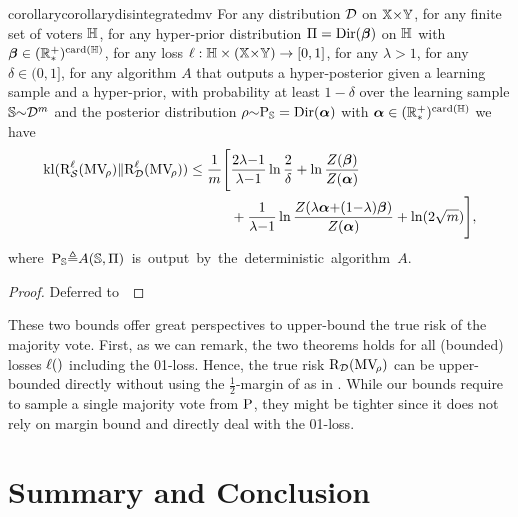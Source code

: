 \begin{restatable}{corollary}{corollarydisintegratedmv}\label{chap:dis-pra:corollary:disintegrated-mv}
For any distribution $\mathcal{D}$ on $\mathbb{X}{\times}\mathbb{Y}$, for any finite set of voters $\mathbb{H}$, for any hyper-prior distribution $\Pi=\textrm{Dir}(\boldsymbol{\beta})$ on $\mathbb{H}$ with $\boldsymbol{\beta}\in(\mathbb{R}^{+}_{*})^{\operatorname{card}(\mathbb{H})}$, for any loss $\ell: \mathbb{H}\times(\mathbb{X}{\times}\mathbb{Y})\to [0,1]$, for any $\lambda>1$, for any $\delta \in (0, 1]$, for any algorithm \mbox{$A$} that outputs a hyper-posterior given a learning sample and a hyper-prior, with probability at least $1{-}\delta$ over the learning sample $\mathbb{S}{\sim}\mathcal{D}^{m}$ and the posterior distribution $\rho{\sim} \mathrm{P}_{\mathbb{S}}=\textrm{Dir}(\boldsymbol{\alpha})$ with $\boldsymbol{\alpha}\in(\mathbb{R}^{+}_{*})^{\operatorname{card}(\mathbb{H})}$ we have
\begin{align*}
    \operatorname{kl}(\text{R}^{\ell}_{\mathcal{S}}(\text{MV}_{\!\rho})\|\text{R}^{\ell}_{\mathcal{D}}(\text{MV}_{\!\rho})) \le \frac{1}{m}\Bigg[&{\frac{2\lambda{-}1}{\lambda{-}1}}\ln\frac{2}{\delta}+ \ln\frac{Z(\boldsymbol{\beta})}{Z(\boldsymbol{\alpha})}\\
    &+ \frac{1}{\lambda{-}1}\ln\frac{Z(\lambda\boldsymbol{\alpha}{+}(1{-}\lambda)\boldsymbol{\beta})}{Z(\boldsymbol{\alpha})} + \ln(2\sqrt{m})\Bigg],
\end{align*}
\mbox{where $\mathrm{P}_{\mathbb{S}}{\triangleq}A(\mathbb{S},\Pi)$ is output by the deterministic algorithm $A$}.
\end{restatable}
\begin{noaddcontents}\begin{proof}
Deferred to~
\end{proof}\end{noaddcontents}

These two bounds offer great perspectives to upper-bound the true risk of the majority vote.
First, as we can remark, the two theorems holds for all (bounded) losses $\ell()$ including the 01-loss.
Hence, the true risk $\text{R}_{\mathcal{D}}(\text{MV}_{\!\rho})$ can be upper-bounded directly without using the $\frac{1}{2}$-margin of \citet{LavioletteMorvantRalaivolaRoy2017} as in .
While our bounds require to sample a single majority vote from $\mathrm{P}$, they might be tighter since it does not rely on margin bound \citep[as][]{BiggsZantedeschiGuedj2022} and directly deal with the 01-loss.


\section{Summary and Conclusion}
\label{chap:dis-pra:sec:conclu}

